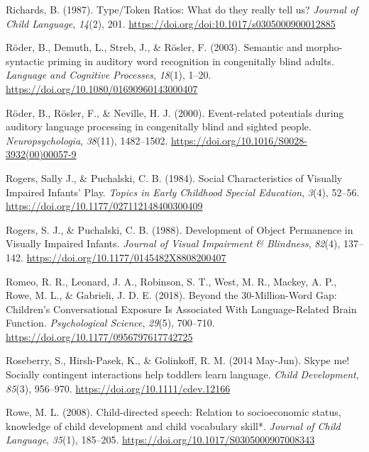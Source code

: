 \documentclass[
  man,floatsintext]{apa6}
\newlength{\cslhangindent}
\newlength{\cslentryspacingunit} %
\newenvironment{CSLReferences}[2] %
 {%
  \setlength{\parindent}{0pt}
  \ifodd #1
  \let\oldpar\par
  \def\par{\hangindent=\cslhangindent\oldpar}
  \fi
  \setlength{\parskip}{#2\cslentryspacingunit}
 }%
 {}
\begin{document}
\begin{CSLReferences}{1}{0}
\leavevmode{}%
Richards, B. (1987). Type/{Token Ratios}: What do they really tell us? \emph{Journal of Child Language}, \emph{14}(2), 201. \url{https://doi.org/doi:10.1017/s0305000900012885}

\leavevmode{}%
Röder, B., Demuth, L., Streb, J., \& Rösler, F. (2003). Semantic and morpho-syntactic priming in auditory word recognition in congenitally blind adults. \emph{Language and Cognitive Processes}, \emph{18}(1), 1--20. \url{https://doi.org/10.1080/01690960143000407}

\leavevmode{}%
Röder, B., Rösler, F., \& Neville, H. J. (2000). Event-related potentials during auditory language processing in congenitally blind and sighted people. \emph{Neuropsychologia}, \emph{38}(11), 1482--1502. \url{https://doi.org/10.1016/S0028-3932(00)00057-9}

\leavevmode{}%
Rogers, Sally J., \& Puchalski, C. B. (1984). Social {Characteristics} of {Visually Impaired Infants}' {Play}. \emph{Topics in Early Childhood Special Education}, \emph{3}(4), 52--56. \url{https://doi.org/10.1177/027112148400300409}

\leavevmode{}%
Rogers, S. J., \& Puchalski, C. B. (1988). Development of {Object Permanence} in {Visually Impaired Infants}. \emph{Journal of Visual Impairment \& Blindness}, \emph{82}(4), 137--142. \url{https://doi.org/10.1177/0145482X8808200407}

\leavevmode{}%
Romeo, R. R., Leonard, J. A., Robinson, S. T., West, M. R., Mackey, A. P., Rowe, M. L., \& Gabrieli, J. D. E. (2018). Beyond the 30-{Million-Word Gap}: {Children}'s {Conversational Exposure Is Associated With Language-Related Brain Function}. \emph{Psychological Science}, \emph{29}(5), 700--710. \url{https://doi.org/10.1177/0956797617742725}

\leavevmode{}%
Roseberry, S., Hirsh-Pasek, K., \& Golinkoff, R. M. (2014 May-Jun). Skype me! {Socially} contingent interactions help toddlers learn language. \emph{Child Development}, \emph{85}(3), 956--970. \url{https://doi.org/10.1111/cdev.12166}

\leavevmode{}%
Rowe, M. L. (2008). Child-directed speech: Relation to socioeconomic status, knowledge of child development and child vocabulary skill*. \emph{Journal of Child Language}, \emph{35}(1), 185--205. \url{https://doi.org/10.1017/S0305000907008343}


\end{CSLReferences}
\end{document}
